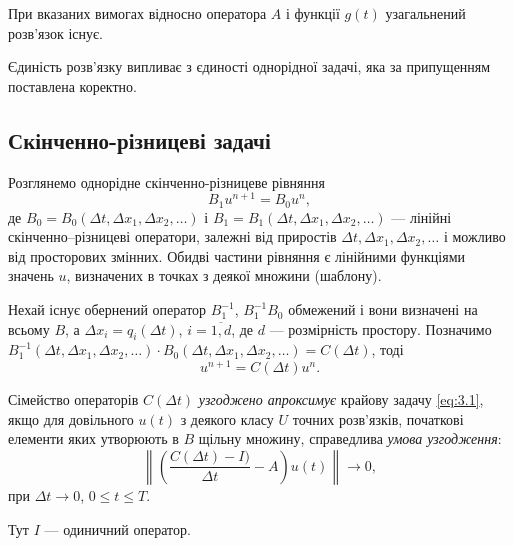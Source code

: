 \begin{proposition}
    При вказаних вимогах відносно оператора $A$ і функції $g(t)$ узагальнений розв'язок існує.
\end{proposition}

\begin{remark}
    Єдиність розв'язку випливає з єдиності однорідної задачі, яка за припущенням поставлена коректно. 
\end{remark}

\subsection{Скінченно-різницеві задачі}

Розглянемо однорідне скінченно-різницеве рівняння 
\begin{equation}
    \label{eq:3.4'}
    B_1 u^{n + 1} = B_0 u^n,
\end{equation}
де $B_0 = B_0(\Delta t, \Delta x_1, \Delta x_2, \ldots)$ і $B_1 = B_1(\Delta t, \Delta x_1, \Delta x_2, \ldots)$ --- лінійні скінченно–різницеві оператори, залежні від приростів $\Delta t, \Delta x_1, \Delta x_2, \ldots$ і можливо від просторових змінних. Обидві частини рівняння є лінійними функціями значень $u$, визначених в точках з деякої множини (шаблону). \medskip

Нехай існує обернений оператор $B_1^{-1}$, $B_1^{-1} B_0$ обмежений і вони визначені на всьому $B$, а $\Delta x_i = q_i(\Delta t)$, $i = \overline{1,d}$, де $d$ --- розмірність простору. Позначимо $B_1^{-1}(\Delta t, \Delta x_1, \Delta x_2, \ldots) \cdot B_0(\Delta t, \Delta x_1, \Delta x_2, \ldots) = C(\Delta t)$, тоді 
\begin{equation}
    \label{eq:3.5}
    u^{n + 1} = C(\Delta t) u^n.
\end{equation}

\begin{definition}
    Сімейство операторів $C(\Delta t)$ \textit{узгоджено апроксимує} крайову задачу \eqref{eq:3.1}, якщо для довільного $u(t)$ з деякого класу $U$ точних розв'язків, початкові елементи яких утворюють в $B$ щільну множину, справедлива \textit{умова узгодження}:
    \begin{equation}
        \label{eq:3.6a}
        \left\| \left( \frac{C(\Delta t) - I)}{\Delta t} - A \right) u(t) \right\| \to 0,
    \end{equation}
    при $\Delta t \to 0$, $0 \le t \le T$.
\end{definition}

Тут $I$ --- одиничний оператор. \medskip

